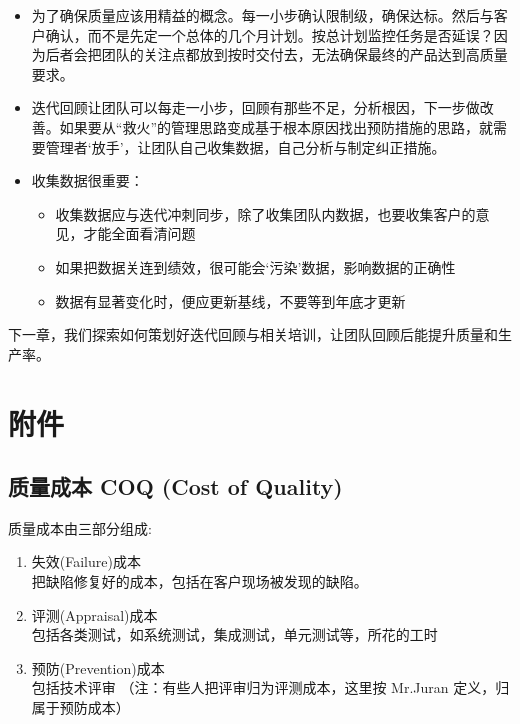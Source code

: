\begin{itemize}
\tightlist
\item
  为了确保质量应该用精益的概念。每一小步确认限制级，确保达标。然后与客户确认，而不是先定一个总体的几个月计划。按总计划监控任务是否延误？因为后者会把团队的关注点都放到按时交付去，无法确保最终的产品达到高质量要求。
\item
  迭代回顾让团队可以每走一小步，回顾有那些不足，分析根因，下一步做改善。如果要从``救火''的管理思路变成基于根本原因找出预防措施的思路，就需要管理者`放手'，让团队自己收集数据，自己分析与制定纠正措施。
\item
  收集数据很重要：

  \begin{itemize}
  \tightlist
  \item
    收集数据应与迭代冲刺同步，除了收集团队内数据，也要收集客户的意见，才能全面看清问题
  \item
    如果把数据关连到绩效，很可能会`污染'数据，影响数据的正确性
  \item
    数据有显著变化时，便应更新基线，不要等到年底才更新
  \end{itemize}
\end{itemize}

下一章，我们探索如何策划好迭代回顾与相关培训，让团队回顾后能提升质量和生产率。

\hypertarget{ux9644ux4ef6}{%
\section{附件}\label{ux9644ux4ef6}}

\hypertarget{ux8d28ux91cfux6210ux672c-coq-cost-of-quality}{%
\subsection{质量成本 COQ (Cost of
Quality)}\label{ux8d28ux91cfux6210ux672c-coq-cost-of-quality}}

质量成本由三部分组成:

\begin{enumerate}
\tightlist
\item
  失效(Failure)成本\\
  把缺陷修复好的成本，包括在客户现场被发现的缺陷。
\item
  评测(Appraisal)成本\\
  包括各类测试，如系统测试，集成测试，单元测试等，所花的工时
\item
  预防(Prevention)成本\\
  包括技术评审 （注：有些人把评审归为评测成本，这里按 Mr.Juran
  定义，归属于预防成本）
\end{enumerate}


